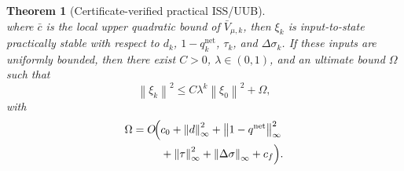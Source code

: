\documentclass[letterpaper,journal]{IEEEtran}
\newcommand{\norm}[1]{\left\lVert #1 \right\rVert}
\newtheorem{theorem}{Theorem}
\begin{document}
\begin{theorem}[Certificate-verified practical ISS/UUB]
\begin{equation}
\end{equation}
where $\bar c$ is the local upper quadratic bound of $\bar V_{\mu,k}$, then $\xi_k$ is input-to-state practically stable with respect to $d_k$, $1-q_k^{\mathrm{net}}$, $\tau_k$, and $\Delta\sigma_k$. If these inputs are uniformly bounded, then there exist $C>0$, $\lambda\in(0,1)$, and an ultimate bound $\Omega$ such that
\begin{equation}
\norm{\xi_k}^2\le C\lambda^k\norm{\xi_0}^2+\Omega ,
\label{eq:uub_bound}
\end{equation}
with
\begin{equation}
\begin{aligned}
\Omega=O\!\Bigl(&
c_0+\norm{d}_{\infty}^2
+\norm{1-q^{\mathrm{net}}}_{\infty}^2\\
&+\norm{\tau}_{\infty}^2
+\norm{\Delta\sigma}_{\infty}+c_f
\Bigr).
\end{aligned}
\label{eq:uub_bound_terms}
\end{equation}
\end{theorem}
\end{document}

